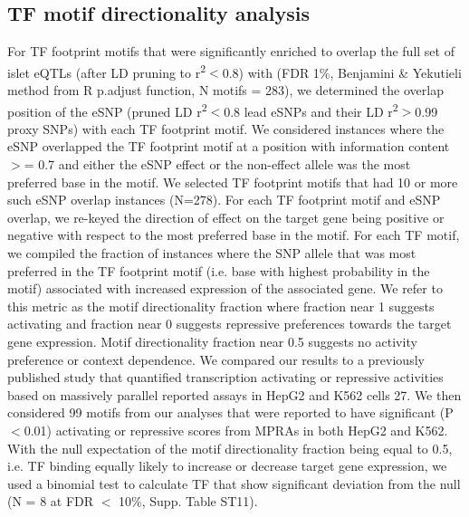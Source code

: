 \subsection{TF motif directionality analysis}
For TF footprint motifs that were significantly enriched to overlap the full set of islet eQTLs (after LD pruning to r\textsuperscript{2}$<$0.8) with (FDR 1\%, Benjamini \& Yekutieli method from R p.adjust function, N motifs = 283), we determined the overlap position of the eSNP (pruned LD r\textsuperscript{2}$<$0.8 lead eSNPs and their LD r\textsuperscript{2}$>$0.99 proxy SNPs) with each TF footprint motif. We considered instances where the eSNP overlapped the TF footprint motif at a position with information content $>$= 0.7 and either the eSNP effect or the non-effect allele was the most preferred base in the motif. We selected TF footprint motifs that had 10 or more such eSNP overlap instances (N=278). For each TF footprint motif and eSNP overlap, we re-keyed the direction of effect on the target gene being positive or negative with respect to the most preferred base in the motif. For each TF motif, we compiled the fraction of instances where the SNP allele that was most preferred in the TF footprint motif (i.e. base with highest probability in the motif) associated with increased expression of the associated gene. We refer to this metric as the motif directionality fraction where fraction near 1 suggests activating and fraction near 0 suggests repressive preferences towards the target gene expression. Motif directionality fraction near 0.5 suggests no activity preference or context dependence.
We compared our results to a previously published study that quantified transcription activating or repressive activities based on massively parallel reported assays in HepG2 and K562 cells 27. We then considered 99 motifs from our analyses that were reported to have significant (P$<$0.01) activating or repressive scores from MPRAs in both HepG2 and K562. With the null expectation of the motif directionality fraction being equal to 0.5, i.e. TF binding equally likely to increase or decrease target gene expression, we used a binomial test to calculate TF that show significant deviation from the null (N = 8 at FDR $<$ 10\%, Supp. Table ST11).

